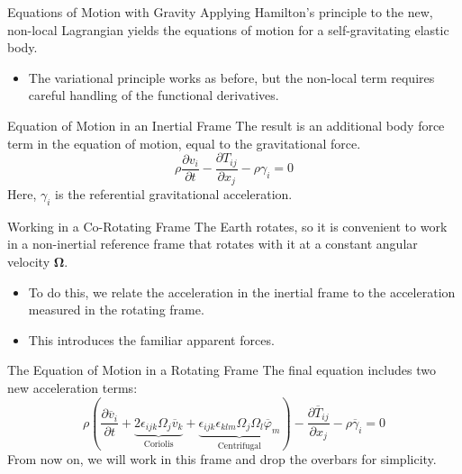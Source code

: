 \documentclass{beamer}
\begin{document}
\begin{frame}{Equations of Motion with Gravity}
    Applying Hamilton's principle to the new, non-local Lagrangian yields the equations of motion for a self-gravitating elastic body.
    \begin{itemize}
        \item The variational principle works as before, but the non-local term requires careful handling of the functional derivatives.
    \end{itemize}
    \pause
    \begin{alertblock}{Equation of Motion in an Inertial Frame}
        The result is an additional body force term in the equation of motion, equal to the gravitational force.
        $$ \rho\frac{\partial v_{i}}{\partial t} - \frac{\partial T_{ij}}{\partial x_{j}} - \rho\gamma_{i} = 0 $$
        Here, $ \gamma_i $ is the referential gravitational acceleration.
    \end{alertblock}
\end{frame}


\begin{frame}{Working in a Co-Rotating Frame}
    The Earth rotates, so it is convenient to work in a non-inertial reference frame that rotates with it at a constant angular velocity $ \mathbf{\Omega} $.
    \pause
    \begin{itemize}
        \item To do this, we relate the acceleration in the inertial frame to the acceleration measured in the rotating frame.
        \pause
        \item This introduces the familiar apparent forces.
    \end{itemize}
    \pause
    \begin{block}{The Equation of Motion in a Rotating Frame}
        The final equation includes two new acceleration terms:
        $$ \rho\left(\frac{\partial\overline{v}_{i}}{\partial t} + \underbrace{2\epsilon_{ijk}\Omega_{j}\overline{v}_{k}}_{\text{Coriolis}} + \underbrace{\epsilon_{ijk}\epsilon_{klm}\Omega_{j}\Omega_{l}\overline{\varphi}_{m}}_{\text{Centrifugal}}\right)-\frac{\partial\overline{T}_{ij}}{\partial x_{j}}-\rho\overline{\gamma}_{i}=0 $$
        From now on, we will work in this frame and drop the overbars for simplicity.
    \end{block}
\end{frame}

\end{document}

